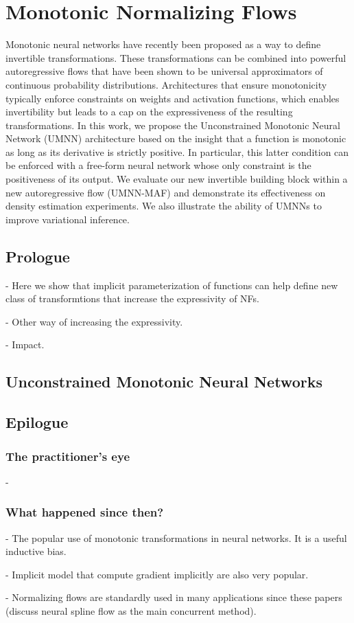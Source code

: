 \chapter{Monotonic Normalizing Flows}\label{ch:05}

\begin{chapter_outline}

Monotonic neural networks have recently been proposed as a way to define invertible transformations.
These transformations can be combined into powerful autoregressive flows that have been shown to be universal approximators of continuous probability distributions.
Architectures that ensure monotonicity typically enforce constraints on weights and activation functions, which enables invertibility but leads to a cap on the expressiveness of the resulting transformations.
In this work, we propose the Unconstrained Monotonic Neural Network (UMNN) architecture based on the insight that a function is monotonic as long as its derivative is strictly positive. In particular, this latter condition can be enforced with a free-form neural network whose only constraint is the positiveness of its output.
We evaluate our new invertible building block within a new autoregressive flow (UMNN-MAF) and demonstrate its effectiveness on density estimation experiments.
We also illustrate the ability of UMNNs to improve variational inference.
\end{chapter_outline}

\section{Prologue}
- Here we show that implicit parameterization of functions can help define new class of transformtions that increase the expressivity of NFs.

- Other way of increasing the expressivity.

- Impact.

\section{Unconstrained Monotonic Neural Networks}


\section{Epilogue}

\subsection{The practitioner's eye}
-

\subsection{What happened since then?}
- The popular use of monotonic transformations in neural networks. It is a useful inductive bias.

- Implicit model that compute gradient implicitly are also very popular.

- Normalizing flows are standardly used in many applications since these papers (discuss neural spline flow as the main concurrent method).
